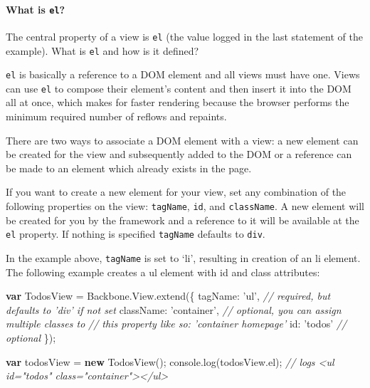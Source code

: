 \documentclass[9pt]{book}
\newenvironment{Shaded}{}{}
\newcommand{\KeywordTok}[1]{\textcolor[rgb]{0.00,0.44,0.13}{\textbf{{#1}}}}
\newcommand{\DataTypeTok}[1]{\textcolor[rgb]{0.56,0.13,0.00}{{#1}}}
\newcommand{\StringTok}[1]{\textcolor[rgb]{0.25,0.44,0.63}{{#1}}}
\newcommand{\CommentTok}[1]{\textcolor[rgb]{0.38,0.63,0.69}{\textit{{#1}}}}
\newcommand{\OtherTok}[1]{\textcolor[rgb]{0.00,0.44,0.13}{{#1}}}
\newcommand{\FunctionTok}[1]{\textcolor[rgb]{0.02,0.16,0.49}{{#1}}}
\newcommand{\NormalTok}[1]{{#1}}
\begin{document}
\paragraph{What is \texttt{el}?}\label{what-is-el}

The central property of a view is \texttt{el} (the value logged in the
last statement of the example). What is \texttt{el} and how is it
defined?

\texttt{el} is basically a reference to a DOM element and all views must
have one. Views can use \texttt{el} to compose their element's content
and then insert it into the DOM all at once, which makes for faster
rendering because the browser performs the minimum required number of
reflows and repaints.

There are two ways to associate a DOM element with a view: a new element
can be created for the view and subsequently added to the DOM or a
reference can be made to an element which already exists in the page.

If you want to create a new element for your view, set any combination
of the following properties on the view: \texttt{tagName}, \texttt{id},
and \texttt{className}. A new element will be created for you by the
framework and a reference to it will be available at the \texttt{el}
property. If nothing is specified \texttt{tagName} defaults to
\texttt{div}.

In the example above, \texttt{tagName} is set to `li', resulting in
creation of an li element. The following example creates a ul element
with id and class attributes:

\begin{Shaded}
\begin{Highlighting}[]
\KeywordTok{var} \NormalTok{TodosView = }\OtherTok{Backbone}\NormalTok{.}\OtherTok{View}\NormalTok{.}\FunctionTok{extend}\NormalTok{(\{}
  \DataTypeTok{tagName}\NormalTok{: }\StringTok{'ul'}\NormalTok{, }\CommentTok{// required, but defaults to 'div' if not set}
  \DataTypeTok{className}\NormalTok{: }\StringTok{'container'}\NormalTok{, }\CommentTok{// optional, you can assign multiple classes to }
                          \CommentTok{// this property like so: 'container homepage'}
  \DataTypeTok{id}\NormalTok{: }\StringTok{'todos'} \CommentTok{// optional}
\NormalTok{\});}

\KeywordTok{var} \NormalTok{todosView = }\KeywordTok{new} \FunctionTok{TodosView}\NormalTok{();}
\OtherTok{console}\NormalTok{.}\FunctionTok{log}\NormalTok{(}\OtherTok{todosView}\NormalTok{.}\FunctionTok{el}\NormalTok{); }\CommentTok{// logs <ul id="todos" class="container"></ul>}
\end{Highlighting}
\end{Shaded}
\end{document}
